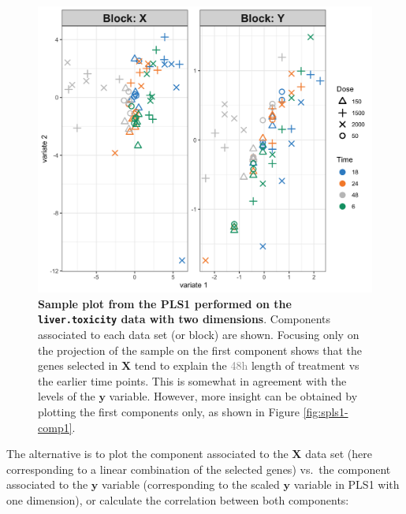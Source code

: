 \documentclass[]{book}
\begin{document}
\begin{figure}

{\centering \includegraphics[width=0.5\linewidth]{Figures/PLS/spls1-ext-1} 

}

\caption{\textbf{Sample plot from the PLS1 performed on the \texttt{liver.toxicity} data with two dimensions}. Components associated to each data set (or block) are shown. Focusing only on the projection of the sample on the first component shows that the genes selected in \(\boldsymbol X\) tend to explain the \textcolor{grey}{48h} length of treatment vs the earlier time points. This is somewhat in agreement with the levels of the \(\boldsymbol y\) variable. However, more insight can be obtained by plotting the first components only, as shown in Figure \ref{fig:spls1-comp1}.}\label{fig:spls1-ext}
\end{figure}



The alternative is to plot the component associated to the \(\boldsymbol X\) data set (here corresponding to a linear combination of the selected genes) vs.~the component associated to the \(\boldsymbol y\) variable (corresponding to the scaled \(\boldsymbol y\) variable in PLS1 with one dimension), or calculate the correlation between both components:
\end{document}
